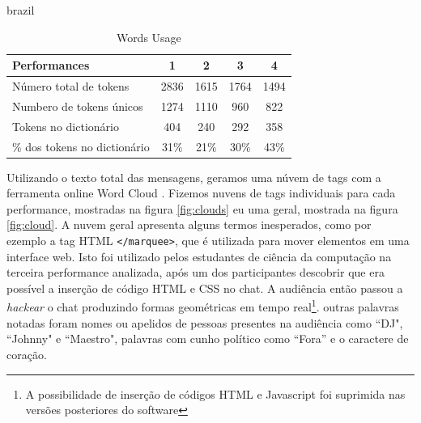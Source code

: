 \begin{otherlanguage*}{brazil}


\begin{table}[ht!]
\caption{Words Usage}{%
\begin{tabular}{@{}lcccc@{}}
\hline
Performances & 1 & 2 & 3 & 4 \\
\hline
Número total de tokens&		2836&   1615&  1764&   1494\\
Numbero de tokens únicos& 1274& 1110& 960& 822\\
Tokens no dictionário &		404&   240&  292&   358\\
\% dos tokens no dictionário &		31\%&   21\%&  30\%&   43\%\\
\end{tabular}}
\label{tab:words}
\end{table}

Utilizando o texto total das mensagens, geramos uma núvem de tags com a ferramenta online Word Cloud \cite{JasonDavies}. Fizemos nuvens de tags individuais para cada performance, mostradas na figura \ref{fig:clouds} eu uma geral, mostrada na figura \ref{fig:cloud}. A nuvem geral apresenta alguns termos inesperados, como por ezemplo a tag HTML \texttt{</marquee>}, que é utilizada para mover elementos em uma interface web. Isto foi utilizado pelos estudantes de ciência da computação na terceira performance analizada, após um dos participantes descobrir que era possível a inserção de código HTML e CSS no chat. A audiência então passou a \emph{hackear} o chat produzindo formas geométricas em tempo real\footnote{A possibilidade de inserção de códigos HTML e Javascript foi suprimida nas versões posteriores do software}. outras palavras notadas foram nomes ou apelidos de pessoas presentes na audiência como ``DJ", ``Johnny" e ``Maestro", palavras com cunho político como ``Fora'' e o caractere de coração. 



\end{otherlanguage*}
